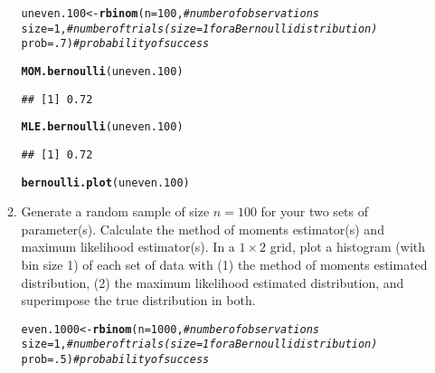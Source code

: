 \documentclass{article}\usepackage[]{graphicx}\usepackage[]{color}
\makeatletter
\newcommand{\hlnum}[1]{\textcolor[rgb]{0.686,0.059,0.569}{#1}}%
\newcommand{\hlcom}[1]{\textcolor[rgb]{0.678,0.584,0.686}{\textit{#1}}}%
\newcommand{\hlstd}[1]{\textcolor[rgb]{0.345,0.345,0.345}{#1}}%
\newcommand{\hlkwb}[1]{\textcolor[rgb]{0.69,0.353,0.396}{#1}}%
\newcommand{\hlkwc}[1]{\textcolor[rgb]{0.333,0.667,0.333}{#1}}%
\newcommand{\hlkwd}[1]{\textcolor[rgb]{0.737,0.353,0.396}{\textbf{#1}}}%
\newenvironment{kframe}{%
 \def\at@end@of@kframe{}%
 \ifinner\ifhmode%
  \def\at@end@of@kframe{\end{minipage}}%
  \begin{minipage}{\columnwidth}%
 \fi\fi%
 \def\FrameCommand##1{\hskip\@totalleftmargin \hskip-\fboxsep
 \colorbox{shadecolor}{##1}\hskip-\fboxsep
     \hskip-\linewidth \hskip-\@totalleftmargin \hskip\columnwidth}%
 \MakeFramed {\advance\hsize-\width
   \@totalleftmargin\z@ \linewidth\hsize
   \@setminipage}}%
 {\par\unskip\endMakeFramed%
 \at@end@of@kframe}
\newenvironment{knitrout}{}{} %
\makeatother
\begin{document}
\begin{enumerate}
\begin{enumerate}
\begin{knitrout}
\begin{kframe}
{\ttfamily\noindent\bfseries\color{errorcolor}{\#\# Error: Can't add `p2` to a ggplot object.}}\begin{alltt}
\hlstd{uneven.100} \hlkwb{<-} \hlkwd{rbinom}\hlstd{(}\hlkwc{n}\hlstd{=}\hlnum{100}\hlstd{,}        \hlcom{#number of observations}
                    \hlkwc{size}\hlstd{=}\hlnum{1}\hlstd{,}        \hlcom{#number of trials (size=1 for a Bernoulli distribution)}
                    \hlkwc{prob}\hlstd{=}\hlnum{.7}\hlstd{)}       \hlcom{#probability of success}

\hlkwd{MOM.bernoulli}\hlstd{(uneven.100)}
\end{alltt}
\begin{verbatim}
## [1] 0.72
\end{verbatim}
\begin{alltt}
\hlkwd{MLE.bernoulli}\hlstd{(uneven.100)}
\end{alltt}
\begin{verbatim}
## [1] 0.72
\end{verbatim}
\begin{alltt}
\hlkwd{bernoulli.plot}\hlstd{(uneven.100)}
\end{alltt}


{\ttfamily\noindent\bfseries\color{errorcolor}{\#\# Error: Can't add `p2` to a ggplot object.}}\end{kframe}
\end{knitrout}
  \item Generate a random sample of size $n=100$ for your two sets of parameter(s).
  Calculate the method of moments estimator(s) and maximum likelihood estimator(s).
  In a $1 \times 2$ grid, plot a histogram (with bin size 1) of each set of data 
  with (1) the method of moments estimated distribution, (2) the maximum likelihood
  estimated distribution, and superimpose the true distribution in both.
\begin{knitrout}
\color{fgcolor}\begin{kframe}
\begin{alltt}
\hlstd{even.1000} \hlkwb{<-} \hlkwd{rbinom}\hlstd{(}\hlkwc{n}\hlstd{=}\hlnum{1000}\hlstd{,}        \hlcom{#number of observations}
                  \hlkwc{size}\hlstd{=}\hlnum{1}\hlstd{,}        \hlcom{#number of trials (size=1 for a Bernoulli distribution)}
                  \hlkwc{prob}\hlstd{=}\hlnum{.5}\hlstd{)}       \hlcom{#probability of success}


\end{alltt}
\end{kframe}
\end{knitrout}
\end{enumerate}
\end{enumerate}
\end{document}
